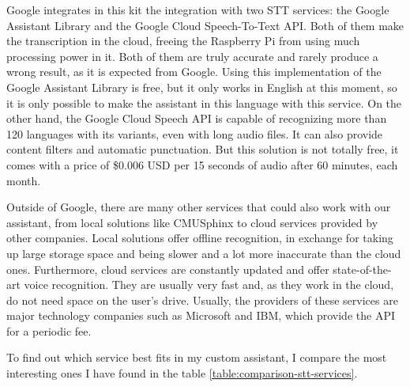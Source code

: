 Google integrates in this kit the integration with two STT services: the Google Assistant Library and the Google Cloud 
Speech-To-Text API\cite{googleCloudSttWebsite}. Both of them make the transcription in the cloud, freeing the Raspberry Pi from 
using much processing power in it. Both of them are truly accurate and rarely produce a wrong result, as it is expected from Google. 
Using this implementation of the Google Assistant Library is free, but it only works in English at this moment, so it is only 
possible to make the assistant in this language with this service. On the other hand, the Google Cloud Speech API is capable of 
recognizing more than 120 languages with its variants, even with long audio files. It can also provide content filters and automatic 
punctuation. But this solution is not totally free, it comes with a price of \$0.006 USD per 15 seconds of audio after 60 minutes, 
each month.\cite{craftworkzBlog}\cite{globalmeBlog}

Outside of Google, there are many other services that could also work with our assistant, from local solutions like 
CMUSphinx\cite{cmusphinxWiki} to cloud services provided by other companies. Local solutions offer offline recognition, in 
exchange for taking up large storage space and being slower and a lot more inaccurate than the cloud ones. Furthermore, 
cloud services are constantly updated and offer state-of-the-art voice recognition. They are usually very fast and, as they work 
in the cloud, do not need space on the user's drive. Usually, the providers of these services are major technology companies 
such as Microsoft and IBM\cite{ibmWatsonSttWebsite}, which provide the API for a periodic fee.

To find out which service best fits in my custom assistant, I compare the most interesting ones I have found in the table 
\ref{table:comparison-stt-services}.

